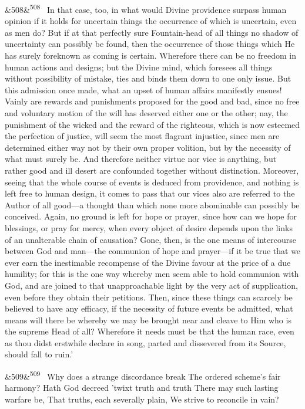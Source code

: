 \documentclass[12pt]{article}
\newcommand{\para}[1][]{\par\noindent\ifx&#1&\else\textsuperscript{\footnotesize #1}~\fi}
\begin{document}
\para[508] In that case, too, in what would Divine providence surpass human opinion if it holds for uncertain things the occurrence of which is uncertain, even as men do? But if at that perfectly sure Fountain-head of all things no shadow of uncertainty can possibly be found, then the occurrence of those things which He has surely foreknown as coming is certain. Wherefore there can be no freedom in human actions and designs; but the Divine mind, which foresees all things without possibility of mistake, ties and binds them down to one only issue. But this admission once made, what an upset of human affairs manifestly ensues! Vainly are rewards and punishments proposed for the good and bad, since no free and voluntary motion of the will has deserved either one or the other; nay, the punishment of the wicked and the reward of the righteous, which is now esteemed the perfection of justice, will seem the most flagrant injustice, since men are determined either way not by their own proper volition, but by the necessity of what must surely be. And therefore neither virtue nor vice is anything, but rather good and ill desert are confounded together without distinction. Moreover, seeing that the whole course of events is deduced from providence, and nothing is left free to human design, it comes to pass that our vices also are referred to the Author of all good---a thought than which none more abominable can possibly be conceived. Again, no ground is left for hope or prayer, since how can we hope for blessings, or pray for mercy, when every object of desire depends upon the links of an unalterable chain of causation? Gone, then, is the one means of intercourse between God and man---the communion of hope and prayer---if it be true that we ever earn the inestimable recompense of the Divine favour at the price of a due humility; for this is the one way whereby men seem able to hold communion with God, and are joined to that unapproachable light by the very act of supplication, even before they obtain their petitions. Then, since these things can scarcely be believed to have any efficacy, if the necessity of future events be admitted, what means will there be whereby we may be brought near and cleave to Him who is the supreme Head of all? Wherefore it needs must be that the human race, even as thou didst erstwhile declare in song, parted and dissevered from its Source, should fall to ruin.'

\para[509] Why does a strange discordance break The ordered scheme's fair harmony? Hath God decreed 'twixt truth and truth There may such lasting warfare be, That truths, each severally plain, We strive to reconcile in vain?
\end{document}
